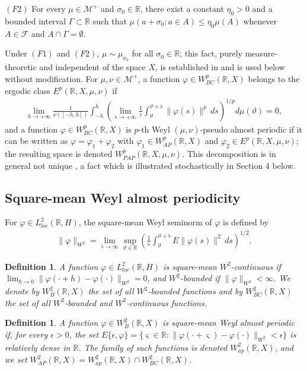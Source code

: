 \documentclass[10pt,a4paper]{amsart}
\newtheorem{definition}[theorem]{Definition}
\begin{document}
$(F2)$ For every $\mu\in\mathcal M^+$ and $\sigma_0\in\mathbb R$, there exist a constant $\eta_0>0$ and a bounded interval $\Gamma\subset\mathbb R$ such that $\mu(a+\sigma_0:a\in A)\le\eta_0\mu(A)$ whenever $A\in\mathcal F$ and $A\cap\Gamma=\emptyset$.

Under $(F1)$ and $(F2)$, $\mu\sim\mu_{\sigma_0}$ for all $\sigma_0\in\mathbb R$; this fact, purely measure-theoretic and independent of the space $X$, is established in \cite{BlotCieutatEzzinbi} and is used below without modification. For $\mu,\nu\in\mathcal M^+$, a function $\varphi\in W^p_{BC}(\mathbb R,X)$ belongs to the ergodic class $E^p(\mathbb R,X,\mu,\nu)$ if
\begin{align*}
\lim_{h\to+\infty}\frac{1}{\nu([-h,h])}\int_{-h}^{h}\left(\lim_{\flat\to+\infty}\frac1\flat\int_{\vartheta}^{\vartheta+\flat}\|\varphi(s)\|^p\,ds\right)^{1/p}d\mu(\vartheta)=0,
\end{align*}
and a function $\varphi\in W^p_{BC}(\mathbb R,X)$ is $p$-th Weyl $(\mu,\nu)$-pseudo almost periodic if it can be written as $\varphi=\varphi_1+\varphi_2$ with $\varphi_1\in W^p_{AP}(\mathbb R,X)$ and $\varphi_2\in E^p(\mathbb R,X,\mu,\nu)$; the resulting space is denoted $W^p_{PAP}(\mathbb R,X,\mu,\nu)$. This decomposition is in general not unique \cite{LiWeyl}, a fact which is illustrated stochastically in Section 4 below.

\subsection{Square-mean Weyl almost periodicity}

For $\varphi\in L^2_{loc}(\mathbb R,H)$, the square-mean Weyl seminorm of $\varphi$ is defined by
\begin{align*}
\|\varphi\|_{W^2}=\lim_{\flat\to\infty}\sup_{\vartheta\in\mathbb R}\left(\frac1\flat\int_{\vartheta}^{\vartheta+\flat}E\|\varphi(s)\|^2\,ds\right)^{1/2}.
\end{align*}

\begin{definition}
A function $\varphi\in L^2_{loc}(\mathbb R,H)$ is square-mean $W^2$-continuous if $\lim_{h\to0}\|\varphi(\cdot+h)-\varphi(\cdot)\|_{W^2}=0$, and $W^2$-bounded if $\|\varphi\|_{W^2}<\infty$. We denote by $W^2_{B}(\mathbb R,X)$ the set of all $W^2$-bounded functions and by $W^2_{BC}(\mathbb R,X)$ the set of all $W^2$-bounded and $W^2$-continuous functions.
\end{definition}

\begin{definition}
A function $\varphi\in W^2_{B}(\mathbb R,X)$ is square-mean Weyl almost periodic if, for every $\epsilon>0$, the set $E\{\epsilon,\varphi\}=\{\varsigma\in\mathbb R:\|\varphi(\cdot+\varsigma)-\varphi(\cdot)\|_{W^2}<\epsilon\}$ is relatively dense in $\mathbb R$. The family of such functions is denoted $W^2_{ap}(\mathbb R,X)$, and we set $W^2_{AP}(\mathbb R,X)=W^2_{ap}(\mathbb R,X)\cap W^2_{BC}(\mathbb R,X)$.
\end{definition}
\end{document}
